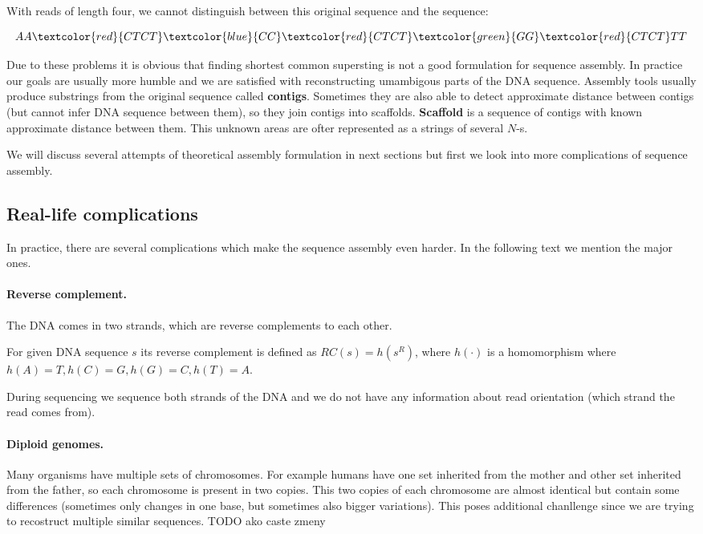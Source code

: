 With reads of length four, we cannot distinguish between this original sequence and
the sequence:

$$AA\textcolor{red}{CTCT}\textcolor{blue}{CC}\textcolor{red}{CTCT}\textcolor{green}{GG}\textcolor{red}{CTCT}TT$$

Due to these problems it is obvious that finding shortest common supersting
is not a good formulation for sequence assembly. 
In practice our goals are usually more humble and we are satisfied with reconstructing
umambigous parts of the DNA sequence. Assembly tools
usually produce substrings from the original sequence called {\bf contigs}.
Sometimes they are also able to detect approximate distance between contigs
(but cannot infer DNA sequence between them), so they join
contigs into scaffolds. {\bf Scaffold} is a sequence of contigs with known
approximate distance between them. 
This unknown areas are ofter represented as a strings of several $N$-s.

We will discuss several attempts of theoretical assembly formulation in
next sections but first we look into more complications of sequence assembly.

\subsection{Real-life complications}

In practice, there are several complications which make the sequence assembly even harder.
In the following text we mention the major ones.

\paragraph{Reverse complement.} 
The DNA comes in two strands, which are reverse complements to each other.

\begin{definition}
For given DNA sequence $s$ its reverse complement is defined as
$RC(s) = h(s^R)$, where $h(\cdot)$ is a homomorphism where $h(A) = T, h(C) = G,
h(G) = C, h(T) = A$. 
\end{definition}

During sequencing we sequence both strands of the DNA and we do not have
any information about read orientation (which strand the read comes from).

\paragraph{Diploid genomes.}
Many organisms have multiple sets of chromosomes. For example humans have one set
inherited from the mother and other set inherited from the father, so each chromosome
is present in two copies. This two copies of each chromosome are almost identical but
contain some differences (sometimes only changes in one base, but sometimes also
bigger variations). This poses additional chanllenge since we are trying to recostruct
multiple similar sequences.
TODO ako caste zmeny

